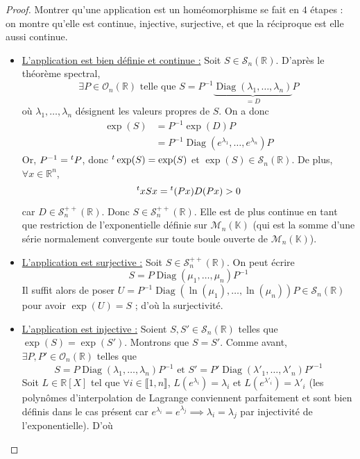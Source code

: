   \begin{proof}
    Montrer qu'une application est un homéomorphisme se fait en $4$ étapes : on montre qu'elle est continue, injective, surjective, et que la réciproque est elle aussi continue.
    \begin{itemize}
      \item \uline{L'application est bien définie et continue :} Soit $S \in \mathcal{S}_n(\mathbb{R})$. D'après le théorème spectral,
      \[ \exists P \in \mathcal{O}_n(\mathbb{R}) \text{ telle que } S = P^{-1} \underbrace{\operatorname{Diag}(\lambda_1, \dots, \lambda_n)}_{= D}P \]
      où $\lambda_1, \dots, \lambda_n$ désignent les valeurs propres de $S$. On a donc
      \begin{align*}
        \exp(S) &= P^{-1} \exp(D) P \\
        &= P^{-1} \operatorname{Diag}(e^{\lambda_1}, \dots, e^{\lambda_n}) P
      \end{align*}
      Or, $P^{-1} = \mathstrut ^t P$, donc $\mathstrut ^t \exp(S) = \exp(S)$ et $\exp(S) \in \mathcal{S}_n(\mathbb{R})$. De plus, $\forall x \in \mathbb{R}^n$,
      \[ \mathstrut ^t x S x = \mathstrut ^t (Px) D (Px) > 0 \]
      car $D \in \mathcal{S}^{++}_n(\mathbb{R})$. Donc $S \in \mathcal{S}^{++}_n(\mathbb{R})$. Elle est de plus continue en tant que restriction de l'exponentielle définie sur $\mathcal{M}_n(\mathbb{K})$ (qui est la somme d'une série normalement convergente sur toute boule ouverte de $\mathcal{M}_n(\mathbb{K})$).
      \item \uline{L'application est surjective :} Soit $S \in \mathcal{S}^{++}_n(\mathbb{R})$. On peut écrire
      \[ S = P \operatorname{Diag}(\mu_1, \dots, \mu_n) P^{-1} \]
      Il suffit alors de poser $U = P^{-1} \operatorname{Diag}(\ln(\mu_1), \dots, \ln(\mu_n)) P \in \mathcal{S}_n(\mathbb{R})$ pour avoir $\exp(U) = S$ ; d'où la surjectivité.
      \item \uline{L'application est injective :} Soient $S, S' \in \mathcal{S}_n(\mathbb{R})$ telles que $\exp(S) = \exp(S')$. Montrons que $S = S'$. Comme avant, $\exists P, P' \in \mathcal{O}_n(\mathbb{R})$ telles que
      \[ S = P \operatorname{Diag}(\lambda_1, \dots, \lambda_n) P^{-1} \text{ et } S' = P' \operatorname{Diag}(\lambda'_1, \dots, \lambda'_n) P'^{-1} \]
      Soit $L \in \mathbb{R}[X]$ tel que $\forall i \in \llbracket 1, n \rrbracket$, $L(e^{\lambda_i}) = \lambda_i$ et $L(e^{\lambda'_i}) = \lambda'_i$ (les polynômes d'interpolation de Lagrange conviennent parfaitement et sont bien définis dans le cas présent car $e^{\lambda_i} = e^{\lambda_j} \implies \lambda_i = \lambda_j$ par injectivité de l'exponentielle). D'où

\end{itemize}
\end{proof}
